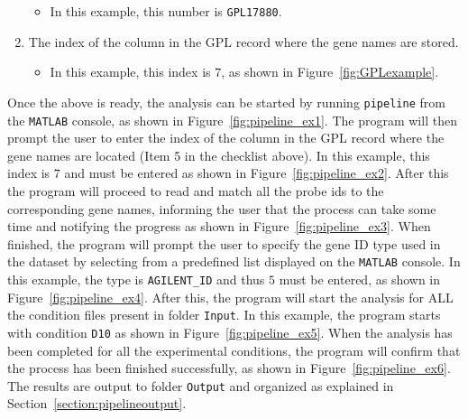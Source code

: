 \documentclass[final,letterpaper,12pt]{article}
\begin{document}
\begin{enumerate}
\begin{itemize}

\item  In this example, this number is \texttt{GPL17880}.
\end{itemize}
\item The index of the column in the GPL record where the gene names are stored.

\begin{itemize}

\item In this example, this index is $7$, as shown in Figure~\ref{fig:GPLexample}.

\end{itemize}
\end{enumerate}


\par Once the above is ready, the analysis can be started by running \texttt{pipeline} from the \texttt{MATLAB} console, as shown in Figure~\ref{fig:pipeline_ex1}. The program will then prompt the user to enter the index of the column in the GPL record where the gene names are located (Item 5 in the checklist above). In this example, this index is $7$ and must be entered as shown in Figure~\ref{fig:pipeline_ex2}. After this the program will proceed to read and match all the probe ids to the corresponding gene names, informing the user that the process can take some time and notifying the progress as shown in Figure~\ref{fig:pipeline_ex3}. When finished, the program will prompt the user to specify the gene ID type used in the dataset by selecting from a predefined list displayed on the \texttt{MATLAB} console. In this example, the type is \texttt{AGILENT\_ID} and thus $5$ must be entered, as shown in Figure~\ref{fig:pipeline_ex4}. After this, the program will start the analysis for ALL the condition files present in folder \texttt{Input}. In this example, the program starts with condition \texttt{D10} as shown in Figure~\ref{fig:pipeline_ex5}. When the analysis has been completed for all the experimental conditions, the program will confirm that the process has been finished successfully, as shown in Figure~\ref{fig:pipeline_ex6}. The results are output to folder \texttt{Output} and organized as explained in Section~\ref{section:pipelineoutput}.
\end{document}
